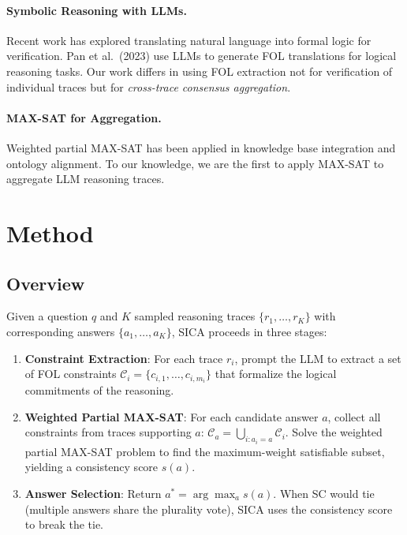\documentclass[11pt,a4paper]{article}
\begin{document}
\paragraph{Symbolic Reasoning with LLMs.}
Recent work has explored translating natural language into formal logic for verification. Pan et al.\ (2023) use LLMs to generate FOL translations for logical reasoning tasks. Our work differs in using FOL extraction not for verification of individual traces but for \emph{cross-trace consensus aggregation}.

\paragraph{MAX-SAT for Aggregation.}
Weighted partial MAX-SAT has been applied in knowledge base integration and ontology alignment. To our knowledge, we are the first to apply MAX-SAT to aggregate LLM reasoning traces.

\section{Method}
\label{sec:method}

\subsection{Overview}

Given a question $q$ and $K$ sampled reasoning traces $\{r_1, \dots, r_K\}$ with corresponding answers $\{a_1, \dots, a_K\}$, SICA proceeds in three stages:

\begin{enumerate}
\item \textbf{Constraint Extraction}: For each trace $r_i$, prompt the LLM to extract a set of FOL constraints $\mathcal{C}_i = \{c_{i,1}, \dots, c_{i,m_i}\}$ that formalize the logical commitments of the reasoning.
\item \textbf{Weighted Partial MAX-SAT}: For each candidate answer $a$, collect all constraints from traces supporting $a$: $\mathcal{C}_a = \bigcup_{i: a_i = a} \mathcal{C}_i$. Solve the weighted partial MAX-SAT problem to find the maximum-weight satisfiable subset, yielding a consistency score $s(a)$.
\item \textbf{Answer Selection}: Return $a^* = \arg\max_a s(a)$. When SC would tie (multiple answers share the plurality vote), SICA uses the consistency score to break the tie.
\end{enumerate}
\end{document}
